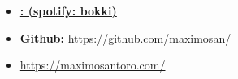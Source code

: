 \documentclass[10pt,a4paper]{moderncv}
\begin{document}
\section{}
\begin{itemize}
    \item \textbf{{\href{https://open.spotify.com/artist/1gmAvUNIqrPSGklxtoj514?si=zmeSuhggQwSlc_M0m4N1xA}{{{: }}(spotify: bokki)}}}
    \item {\href{https://github.com/maximosan/}{\textbf{Github: }https://github.com/maximosan/}}
    \item {\href{https://maximosantoro.com/}{\textbf{}https://maximosantoro.com/}}
\end{itemize}
\end{document}

